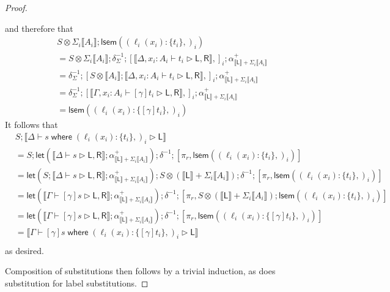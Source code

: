 \documentclass[acmsmall,screen,review]{acmart}
\newcommand{\ms}[1]{\ensuremath{\mathsf{#1}}}
\newcommand{\lto}{:}
\newcommand{\where}[2]{#1\;\ms{where}\;#2}
\newcommand{\wbranch}[3]{#1(#2) \lto \{#3\}}
\newcommand{\bhyp}[2]{#1 : #2}
\newcommand{\haslb}[3]{#1 \vdash #2 \rhd #3}
\newcommand{\dnt}[1]{\llbracket{#1}\rrbracket}
\newcommand{\loopmor}[1]{\ms{lsem}(#1)}
\newcommand{\lmor}[1]{\ms{let}(#1)}
\begin{document}
\begin{proof}
\begin{itemize}[leftmargin=*]
\begin{equation}
    \end{equation}
    and therefore that
    \begin{equation}
      \begin{aligned}
        & S \otimes \Sigma_i\dnt{A_i} 
        ; \loopmor{(\wbranch{\ell_i}{x_i}{t_i},)_i} \\
        & = S \otimes \Sigma_i\dnt{A_i} 
        ; \delta^{-1}_{\Sigma} ; 
        [ 
          \dnt{\haslb{\Delta, \bhyp{x_i}{A_i}}{t_i}{\ms{L}, \ms{R}}},
        ]_i
        ; \alpha^+_{\dnt{\ms{L}} + \Sigma_i \dnt{A_i}} \\
        & = \delta^{-1}_{\Sigma} ; 
        [ 
          S \otimes \dnt{A_i} ;
          \dnt{\haslb{\Delta, \bhyp{x_i}{A_i}}{t_i}{\ms{L}, \ms{R}}},
        ]_i
        ; \alpha^+_{\dnt{\ms{L}} + \Sigma_i \dnt{A_i}} \\
        & = \delta^{-1}_{\Sigma} ; 
        [ 
          \dnt{\haslb{\Gamma, \bhyp{x_i}{A_i}}{[\gamma]t_i}{\ms{L}, \ms{R}}},
        ]_i
        ; \alpha^+_{\dnt{\ms{L}} + \Sigma_i \dnt{A_i}} \\
        & = \loopmor{(\wbranch{\ell_i}{x_i}{[\gamma]t_i},)_i}
      \end{aligned}
    \end{equation}
    It follows that
    \begin{equation}
      \begin{aligned}
        & S
          ; \dnt{\haslb{\Delta}{\where{s}{(\wbranch{\ell_i}{x_i}{t_i},)_i}}{\ms{L}}} \\
        & = S
          ; \lmor{\dnt{\haslb{\Delta}{s}{\ms{L}, \ms{R}}} 
            ; \alpha^+_{\dnt{\ms{L}} + \Sigma_i \dnt{A_i}}}
          ; \delta^{-1}
          ; [\pi_r, \loopmor{(\wbranch{\ell_i}{x_i}{t_i},)_i}] \\
        & = \lmor{S ; \dnt{\haslb{\Delta}{s}{\ms{L}, \ms{R}}} 
            ; \alpha^+_{\dnt{\ms{L}} + \Sigma_i \dnt{A_i}}}
          ; S \otimes (\dnt{\ms{L}} + \Sigma_i \dnt{A_i})
          ; \delta^{-1}
          ; [\pi_r, \loopmor{(\wbranch{\ell_i}{x_i}{t_i},)_i}] \\
        & = \lmor{\dnt{\haslb{\Gamma}{[\gamma]s}{\ms{L}, \ms{R}}} 
            ; \alpha^+_{\dnt{\ms{L}} + \Sigma_i \dnt{A_i}}}
          ; \delta^{-1}
          ; [\pi_r, 
            S \otimes (\dnt{\ms{L}} + \Sigma_i \dnt{A_i}) 
            ; \loopmor{(\wbranch{\ell_i}{x_i}{t_i},)_i}] \\
        & = \lmor{\dnt{\haslb{\Gamma}{[\gamma]s}{\ms{L}, \ms{R}}} 
            ; \alpha^+_{\dnt{\ms{L}} + \Sigma_i \dnt{A_i}}}
          ; \delta^{-1}
          ; [\pi_r, \loopmor{(\wbranch{\ell_i}{x_i}{[\gamma]t_i},)_i}] \\
        & = \dnt{\haslb{\Gamma}
          {\where{[\gamma]s}
          {(\wbranch{\ell_i}{x_i}{[\gamma]t_i},)_i}}{\ms{L}}} \\
      \end{aligned}
    \end{equation}
    as desired.
  \end{itemize}
  Composition of substitutions then follows by a trivial induction, as does substitution for label
  substitutions.
\end{proof}
\end{document}
